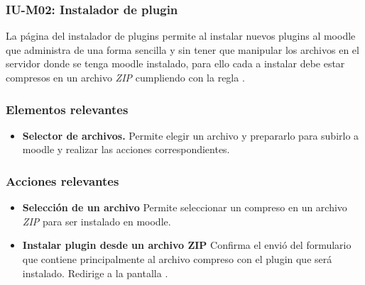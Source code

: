 
\subsubsection{IU-M02: Instalador de plugin}

 La página del instalador de plugins permite al  instalar nuevos plugins al
 moodle que administra de una forma sencilla y sin tener que manipular los archivos en el servidor
 donde se tenga moodle instalado, para ello cada  a instalar debe estar
 compresos en un archivo {\it ZIP} cumpliendo con la regla .


\subsubsection{Elementos relevantes}

    \begin{itemize}
    \item {\bf Selector de archivos.}
        Permite elegir un archivo y prepararlo para subirlo a moodle
        y realizar las acciones correspondientes.
    \end{itemize}

\subsubsection{Acciones relevantes}

    \begin{itemize}
    \item {\bf Selección de un archivo}
        Permite seleccionar un  compreso en un archivo {\it ZIP} para
        ser instalado en moodle.

    \item {\bf Instalar plugin desde un archivo ZIP}
        Confirma el envió del formulario que contiene principalmente al archivo compreso con
        el plugin que será instalado. Redirige a la pantalla .
    \end{itemize}

\clearpage
